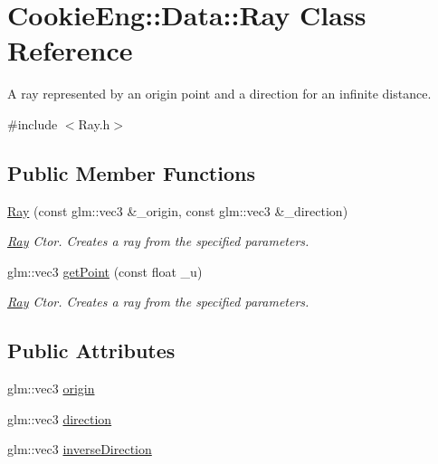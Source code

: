 \hypertarget{struct_cookie_eng_1_1_data_1_1_ray}{}\section{Cookie\+Eng\+:\+:Data\+:\+:Ray Class Reference}
\label{struct_cookie_eng_1_1_data_1_1_ray}


A ray represented by an origin point and a direction for an infinite distance.  




{\ttfamily \#include $<$Ray.\+h$>$}

\subsection*{Public Member Functions}
\begin{DoxyCompactItemize}
\item 
\hyperlink{struct_cookie_eng_1_1_data_1_1_ray_a1e9b2fe1c7b82f3ef7e405dbe8a5f4ee}{Ray} (const glm\+::vec3 \&\+\_\+origin, const glm\+::vec3 \&\+\_\+direction)
\begin{DoxyCompactList}\small\item\em \hyperlink{struct_cookie_eng_1_1_data_1_1_ray}{Ray} Ctor. Creates a ray from the specified parameters. \end{DoxyCompactList}\item 
glm\+::vec3 \hyperlink{struct_cookie_eng_1_1_data_1_1_ray_a2681dc85c2d445e36a77bd623d125fb8}{get\+Point} (const float \+\_\+u)
\begin{DoxyCompactList}\small\item\em \hyperlink{struct_cookie_eng_1_1_data_1_1_ray}{Ray} Ctor. Creates a ray from the specified parameters. \end{DoxyCompactList}\end{DoxyCompactItemize}
\subsection*{Public Attributes}
\begin{DoxyCompactItemize}
\item 
glm\+::vec3 \hyperlink{struct_cookie_eng_1_1_data_1_1_ray_ac5a0fd9b0d2466d33a6c6c757ac1fec8}{origin}
\item 
glm\+::vec3 \hyperlink{struct_cookie_eng_1_1_data_1_1_ray_aa245307862a93851ec6bc93ec23ee829}{direction}
\item 
glm\+::vec3 \hyperlink{struct_cookie_eng_1_1_data_1_1_ray_a298fe1967f5d951f5b2e897e52da8519}{inverse\+Direction}
\end{DoxyCompactItemize}
